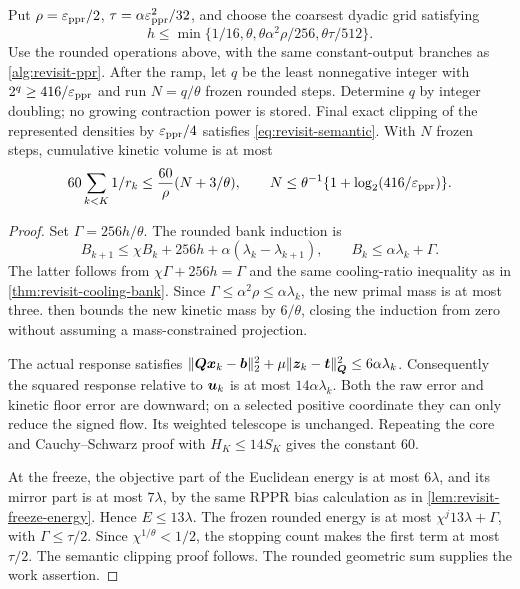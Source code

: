 \begin{theorem}
\label{thm:revisit-rounded-semantic}
Put $\rho=\varepsilon_{\mathrm{ppr}}/2$, $\tau=\alpha\varepsilon_{\mathrm{ppr}}^2/32$, and choose the
coarsest dyadic grid satisfying
\begin{equation}
 h\leq\min\{1/16,\theta,
           \theta\alpha^2\rho/256,\theta\tau/512\}.
 \label{eq:revisit-rounded-grid}
\end{equation}
Use the rounded operations above, with the same constant-output branches
as \cref{alg:revisit-ppr}. After the ramp, let $q$ be the least nonnegative
integer with $2^q\geq416/\varepsilon_{\mathrm{ppr}}$ and run $N=q/\theta$ frozen rounded
steps. Determine $q$ by integer doubling; no growing contraction power
is stored. Final exact clipping of the represented
densities by $\varepsilon_{\mathrm{ppr}}/4$ satisfies \cref{eq:revisit-semantic}.
With $N$ frozen steps, cumulative kinetic volume is at most
\begin{equation}
 60\sum_{k<K}1/r_k
 \leq\frac{60}{\rho}(N+3/\theta),
 \qquad N\leq\theta^{-1}\{1+\log_2(416/\varepsilon_{\mathrm{ppr}})\}.
 \label{eq:revisit-rounded-work}
\end{equation}
\end{theorem}
\begin{proof}
Set $\Gamma=256h/\theta$. The rounded bank induction is
\[
 B_{k+1}\leq\chi B_k+256h+\alpha(\lambda_k-\lambda_{k+1}),
 \qquad B_k\leq\alpha\lambda_k+\Gamma.
\]
The latter follows from $\chi\Gamma+256h=\Gamma$ and the same
cooling-ratio inequality as in \cref{thm:revisit-cooling-bank}.
Since $\Gamma\leq\alpha^2\rho\leq\alpha\lambda_k$, the new primal
mass is at most three.  then bounds
the new kinetic mass by $6/\theta$, closing the induction from zero
without assuming a mass-constrained projection.

The actual response satisfies
$\|\bm{Q}\bm{x}_k-\bm{b}\|_2^2+\mu\|\bm{z}_k-\bm{t}\|_{\bm{Q}}^2
\leq6\alpha\lambda_k$.
Consequently the squared response relative to $\bm{u}_k$ is at most
$14\alpha\lambda_k$. Both the raw error and kinetic floor error are
downward; on a selected positive coordinate they can only reduce the
signed flow. Its weighted telescope is unchanged. Repeating the core and
Cauchy--Schwarz proof with $H_K\leq14S_K$ gives the constant $60$.

At the freeze, the objective part of the Euclidean energy is at most
$6\lambda$, and its mirror part is at most $7\lambda$, by the same
RPPR bias calculation as in \cref{lem:revisit-freeze-energy}. Hence
$E\leq13\lambda$. The frozen rounded energy is at most
$\chi^j13\lambda+\Gamma$, with $\Gamma\leq\tau/2$.
Since $\chi^{1/\theta}<1/2$, the stopping count makes the first term
at most $\tau/2$. The semantic clipping proof follows. The rounded
geometric sum supplies the work assertion.
\end{proof}

